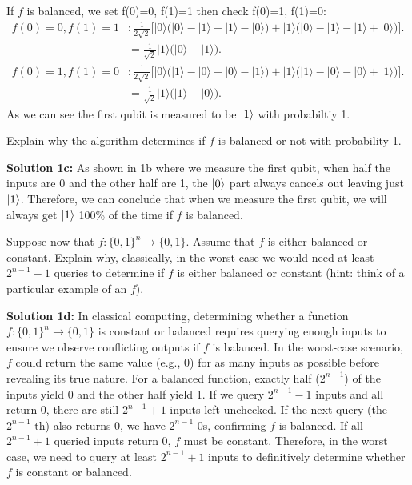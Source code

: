 \documentclass{article}
\begin{document}
\begin{itemize}
    If $f$ is balanced, we set f(0)=0, f(1)=1 then check f(0)=1, f(1)=0:
    \begin{align*}
        f(0)=0, f(1)=1 &:\frac{1}{2\sqrt{2}} \Big[
        |0\rangle \big( |0\rangle - |1\rangle + |1\rangle - |0\rangle \big)
        + |1\rangle \big( |0\rangle - |1\rangle - |1\rangle + |0\rangle \big)\Big].\\
        &= \frac{1}{\sqrt{2}} |1\rangle \big( |0\rangle - |1\rangle \big).\\
        f(0)=1,f(1)=0&: \frac{1}{2\sqrt{2}} \Big[
        |0\rangle \big( |1\rangle - |0\rangle + |0\rangle - |1\rangle \big)+ |1\rangle \big( |1\rangle - |0\rangle - |0\rangle + |1\rangle \big)\Big].\\
        &=\frac{1}{\sqrt{2}} |1\rangle \big( |1\rangle - |0\rangle \big).
    \end{align*}
    As we can see the first qubit is measured to be $\ket{1}$ with probabiltiy 1. 
\end{itemize}

\newpage
\begin{question}[title=QUESTION 1c]
Explain why the algorithm determines if \(f\) is balanced or not with probability 1.
\end{question}

\textbf{Solution 1c:} As shown in 1b where we measure the first qubit, when half the inputs are 0 and the other half are 1, the $\ket{0}$ part always cancels out leaving just $\ket{1}$. Therefore, we can conclude that when we measure the first qubit, we will always get $\ket{1}$ 100\% of the time if $f$ is balanced.

\newpage
\begin{question}[title=QUESTION 1d]
Suppose now that \(f:\{0,1\}^{n} \rightarrow \{0,1\}\). Assume that \(f\) is either balanced or constant. Explain why, classically, in the worst case we would need at least \(2^{n-1} - 1\) queries to determine if \(f\) is either balanced or constant (hint: think of a particular example of an \(f\)).
\end{question}

\textbf{Solution 1d:} In classical computing, determining whether a function \( f: \{0,1\}^n \rightarrow \{0,1\} \) is constant or balanced requires querying enough inputs to ensure we observe conflicting outputs if \( f \) is balanced. In the worst-case scenario, \( f \) could return the same value (e.g., 0) for as many inputs as possible before revealing its true nature. For a balanced function, exactly half (\(2^{n-1}\)) of the inputs yield 0 and the other half yield 1. If we query \(2^{n-1} - 1\) inputs and all return 0, there are still \(2^{n-1} + 1\) inputs left unchecked. If the next query (the \(2^{n-1}\)-th) also returns 0, we have \(2^{n-1}\) 0s, confirming \( f \) is balanced. If all \(2^{n-1} + 1\) queried inputs return 0, \( f \) must be constant. Therefore, in the worst case, we need to query at least \(2^{n-1} + 1\) inputs to definitively determine whether \( f \) is constant or balanced.
\end{document}
